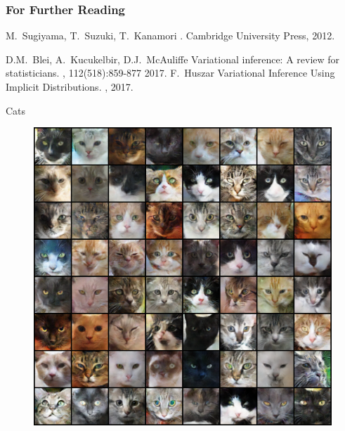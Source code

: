 \documentclass[handout]{beamer}
\begin{document}
%
\begin{frame}[allowframebreaks]
  \frametitle<presentation>{For Further Reading}
    
  \begin{thebibliography}{10}
    
  \beamertemplatebookbibitems

    M.~Sugiyama, T.~Suzuki, T.~Kanamori
    .
    \newblock Cambridge University Press, 2012.
 
    
  \beamertemplatearticlebibitems
    D.M.~Blei, A.~Kucukelbir, D.J.~McAuliffe
    \newblock Variational inference: A review for statisticians.
    , 112(518):859-877
    2017.
    F.~Huszar
    \newblock Variational Inference Using Implicit Distributions.
    ,
    2017.
  \end{thebibliography}
\end{frame}
\begin{frame}{Cats}
\begin{figure}
\includegraphics[scale=0.4]{cats.png}
\end{figure}
\end{frame}
\end{document}
